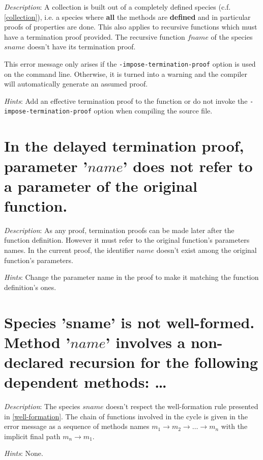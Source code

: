 {\em Description}: A collection is built  out of a completely defined species
(c.f. \ref{collection}), i.e. a species where {\bf all} the methods
are {\bf defined} and in particular proofs of properties are
done. This also applies to recursive functions which must have a
termination proof provided. The recursive function $fname$ of the
species $sname$ doesn't have its termination proof.

This error message only arises if the {\tt -impose-termination-proof}
option is used on the command line. Otherwise, it is turned into a
warning and the compiler will automatically generate an assumed
proof.

{\em Hints}: Add an effective termination proof to the function or do
not invoke the {\tt -impose-termination-proof} option when compiling
the source file.



\section*{In the delayed termination proof, parameter '$name$' does
  not refer to a parameter of the original function.}

{\em Description}: As any proof, termination proofs can be made later
after the function definition. However it must refer to the original
function's parameters names. In the current proof, the identifier
$name$ doesn't exist among the original function's parameters.

{\em Hints}: Change the parameter name in the proof to make it
matching the function definition's ones.



\section*{Species 'sname' is not well-formed. Method  '$name$' involves
  a non-declared recursion for the following dependent methods: \ldots}

{\em Description}: The species $sname$ doesn't respect the
well-formation rule presented in \ref{well-formation}. The chain of
functions involved in the cycle is given in the error message as a
sequence of methods names
$m_1 \rightarrow m_2 \rightarrow \ldots \rightarrow m_n$ with the
implicit final path $m_n \rightarrow m_1$.

{\em Hints}: None.



